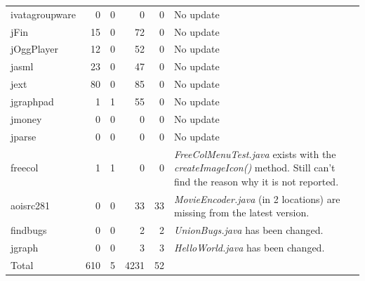 \documentclass{IEEEtran}
\begin{document}
\begin{table}[H]
\begin{tabular}{l|r|r|r|r|p{6cm}}
	ivatagroupware	& 0	& 0		& 0		& 0 & No update \\
	jFin		& 15	& 0		& 72	& 0 & No update \\
	jOggPlayer	& 12 	& 0		& 52	& 0 & No update \\
	jasml		& 23	& 0		& 47	& 0 & No update \\
	jext		& 80	& 0		& 85	& 0 & No update \\
	jgraphpad	& 1		& 1		& 55	& 0 & No update \\
	jmoney		& 0		& 0		& 0		& 0 & No update \\
	jparse		& 0		& 0		& 0		& 0 & No update \\
	\hline
	freecol		& 1		& 1		& 0		& 0		& \textit{FreeColMenuTest.java} exists with the \textit{createImageIcon()} method. Still can't find the reason why it is not reported. \\		
	aoisrc281	& 0		& 0		& 33	& 33 	& \textit{MovieEncoder.java} (in 2 locations) are missing from the latest version. \\
	findbugs	& 0		& 0		& 2		& 2 	& \textit{UnionBugs.java} has been changed. \\
	jgraph		& 0		& 0		& 3		& 3 	& \textit{HelloWorld.java} has been changed. \\
	\hline
	Total		& 610	& 5		& 4231	& 52 	&\\
	\hline
\end{tabular}
\end{table}
\end{document}
